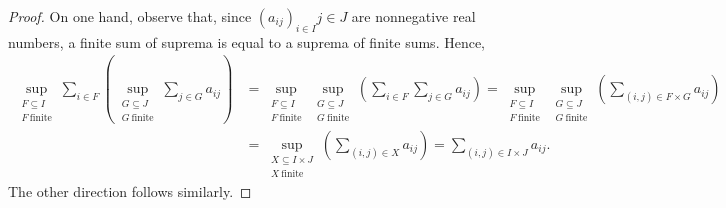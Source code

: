 \documentclass[12pt,letterpaper]{article}
\newcommand{\sub}{\subseteq}
\begin{document}
\begin{proof}
  On one hand, observe that, since $ (a_{ij})_{i\in I}{j\in J}$ are nonnegative real numbers, a finite sum of suprema is equal to a suprema of finite sums. Hence,
  \begin{align*}
    \sup_{\substack{F\sub I \\ F\ \textrm{finite}}}\sum_{i\in F} \left(\sup_{\substack{G\sub J \\ G\ \textrm{finite}}} \sum_{j\in G} a_{ij}\right)
    &= \sup_{\substack{F\sub I \\ F\ \textrm{finite}}} \sup_{\substack{G\sub J \\ G\ \textrm{finite}}} \left(\sum_{i\in F}\sum_{j\in G} a_{ij}\right)  = \sup_{\substack{F\sub I \\ F\ \textrm{finite}}} \sup_{\substack{G\sub J \\ G\ \textrm{finite}}} \left(\sum_{(i,j) \in F\times G} a_{ij}\right) \\
    &=\sup_{\substack{X\sub I \times J \\ X\ \textrm{finite}}} \left(\sum_{(i,j) \in X} a_{ij}\right) = \sum_{(i,j)\in I\times J} a_{ij}.
  \end{align*}
  The other direction follows similarly.
\end{proof}
\end{document}
